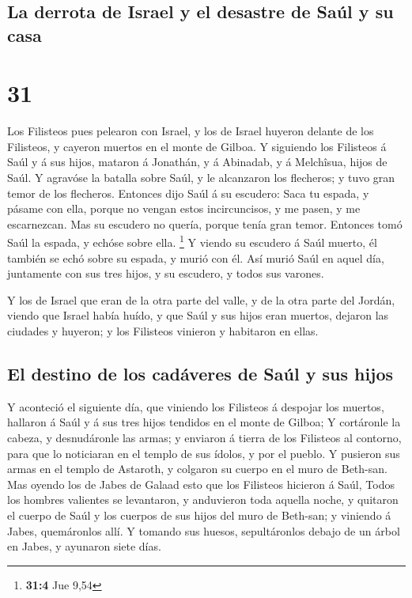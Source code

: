 \hypertarget{la-derrota-de-israel-y-el-desastre-de-sauxfal-y-su-casa}{%
\subsection{La derrota de Israel y el desastre de Saúl y su
casa}\label{la-derrota-de-israel-y-el-desastre-de-sauxfal-y-su-casa}}

\hypertarget{section-30}{%
\section{31}\label{section-30}}

 Los Filisteos pues pelearon con Israel, y los de Israel
huyeron delante de los Filisteos, y cayeron muertos en el monte de
Gilboa.  Y siguiendo los Filisteos á Saúl y á sus hijos,
mataron á Jonathán, y á Abinadab, y á Melchîsua, hijos de Saúl.
 Y agravóse la batalla sobre Saúl, y le alcanzaron los
flecheros; y tuvo gran temor de los flecheros.  Entonces
dijo Saúl á su escudero: Saca tu espada, y pásame con ella, porque no
vengan estos incircuncisos, y me pasen, y me escarnezcan. Mas su
escudero no quería, porque tenía gran temor. Entonces tomó Saúl la
espada, y echóse sobre ella. \footnote{\textbf{31:4} Jue 9,54}
 Y viendo su escudero á Saúl muerto, él también se echó
sobre su espada, y murió con él.  Así murió Saúl en aquel
día, juntamente con sus tres hijos, y su escudero, y todos sus varones.

 Y los de Israel que eran de la otra parte del valle, y de
la otra parte del Jordán, viendo que Israel había huído, y que Saúl y
sus hijos eran muertos, dejaron las ciudades y huyeron; y los Filisteos
vinieron y habitaron en ellas.

\hypertarget{el-destino-de-los-caduxe1veres-de-sauxfal-y-sus-hijos}{%
\subsection{El destino de los cadáveres de Saúl y sus
hijos}\label{el-destino-de-los-caduxe1veres-de-sauxfal-y-sus-hijos}}

 Y aconteció el siguiente día, que viniendo los Filisteos
á despojar los muertos, hallaron á Saúl y á sus tres hijos tendidos en
el monte de Gilboa;  Y cortáronle la cabeza, y
desnudáronle las armas; y enviaron á tierra de los Filisteos al
contorno, para que lo noticiaran en el templo de sus ídolos, y por el
pueblo.  Y pusieron sus armas en el templo de Astaroth, y
colgaron su cuerpo en el muro de Beth-san.  Mas oyendo
los de Jabes de Galaad esto que los Filisteos hicieron á Saúl,
 Todos los hombres valientes se levantaron, y anduvieron
toda aquella noche, y quitaron el cuerpo de Saúl y los cuerpos de sus
hijos del muro de Beth-san; y viniendo á Jabes, quemáronlos allí.
 Y tomando sus huesos, sepultáronlos debajo de un árbol
en Jabes, y ayunaron siete días.

